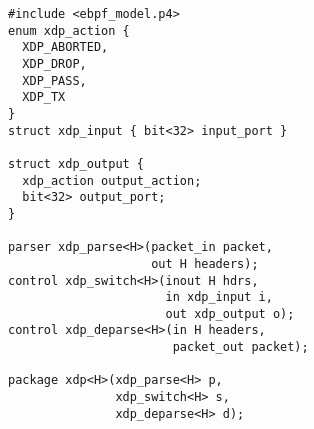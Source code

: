 \begin{lstlisting}
#include <ebpf_model.p4>
enum xdp_action {
  XDP_ABORTED,
  XDP_DROP,
  XDP_PASS,
  XDP_TX
}
struct xdp_input { bit<32> input_port }

struct xdp_output {
  xdp_action output_action;
  bit<32> output_port;
}

parser xdp_parse<H>(packet_in packet,
                    out H headers);
control xdp_switch<H>(inout H hdrs,
                      in xdp_input i,
                      out xdp_output o);
control xdp_deparse<H>(in H headers,
                       packet_out packet);

package xdp<H>(xdp_parse<H> p,
               xdp_switch<H> s,
               xdp_deparse<H> d);
\end{lstlisting}
